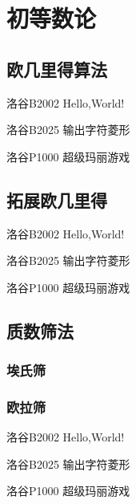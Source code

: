 \chapter{初等数论}

\section{欧几里得算法}

\begin{problemset}
	\item 洛谷B2002 Hello,World!
	\item 洛谷B2025 输出字符菱形
	\item 洛谷P1000 超级玛丽游戏
\end{problemset}

\section{拓展欧几里得}

\begin{problemset}
	\item 洛谷B2002 Hello,World!
	\item 洛谷B2025 输出字符菱形
	\item 洛谷P1000 超级玛丽游戏
\end{problemset}

\section{质数筛法}


\subsection{埃氏筛}



\subsection{欧拉筛}


\begin{problemset}
\item 洛谷B2002 Hello,World!
\item 洛谷B2025 输出字符菱形
\item 洛谷P1000 超级玛丽游戏
\end{problemset}


